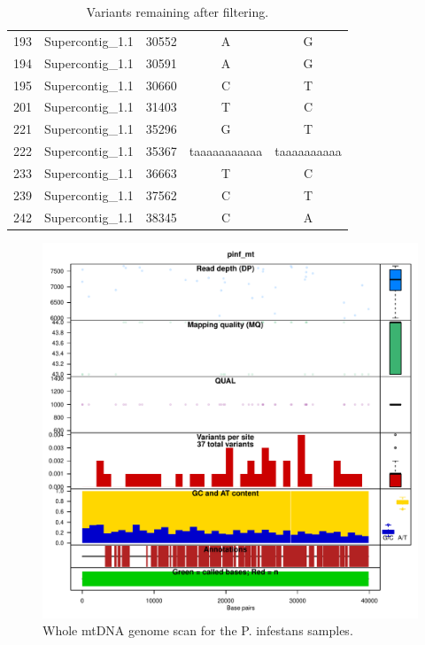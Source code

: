 \documentclass{article}\usepackage[]{graphicx}\usepackage[]{color}
\makeatletter
\def\maxwidth{ %
  \ifdim\Gin@nat@width>\linewidth
    \linewidth
  \else
    \Gin@nat@width
  \fi
}
\newenvironment{knitrout}{}{} %
\makeatother
\begin{document}
\begin{table}[ht]
\begin{tabular}{llccc}
  193 & Supercontig\_1.1 & 30552 & A & G \\ 
  194 & Supercontig\_1.1 & 30591 & A & G \\ 
  195 & Supercontig\_1.1 & 30660 & C & T \\ 
  201 & Supercontig\_1.1 & 31403 & T & C \\ 
  221 & Supercontig\_1.1 & 35296 & G & T \\ 
  222 & Supercontig\_1.1 & 35367 & taaaaaaaaaaa & taaaaaaaaaa \\ 
  233 & Supercontig\_1.1 & 36663 & T & C \\ 
  239 & Supercontig\_1.1 & 37562 & C & T \\ 
  242 & Supercontig\_1.1 & 38345 & C & A \\ 
   \hline
\end{tabular}
\caption{Variants remaining after filtering.} 
\label{ptab}
\end{table}




\begin{knitrout}
\color{fgcolor}\begin{figure}[p]

\includegraphics[width=\maxwidth]{figure/chromogc} \caption[Whole mtDNA genome scan for the P]{Whole mtDNA genome scan for the P. infestans samples.\label{fig:chromogc}}
\end{figure}


\end{knitrout}
\end{document}
